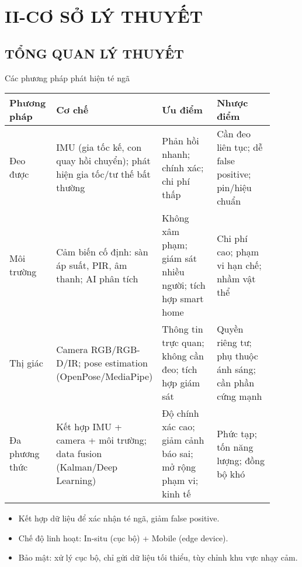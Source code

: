 \section{II-CƠ SỞ LÝ THUYẾT}
\subsection{TỔNG QUAN LÝ THUYẾT}
\begin{frame}{Các phương pháp phát hiện té ngã}
\scriptsize
\begin{tabular}{|p{0.18\linewidth}|p{0.22\linewidth}|p{0.25\linewidth}|p{0.25\linewidth}|}
\hline
\textbf{Phương pháp} & \textbf{Cơ chế} & \textbf{Ưu điểm} & \textbf{Nhược điểm} \\
\hline
Đeo được & IMU (gia tốc kế, con quay hồi chuyển); phát hiện gia tốc/tư thế bất thường & Phản hồi nhanh; chính xác; chi phí thấp & Cần đeo liên tục; dễ false positive; pin/hiệu chuẩn \\
\hline
Môi trường & Cảm biến cố định: sàn áp suất, PIR, âm thanh; AI phân tích & Không xâm phạm; giám sát nhiều người; tích hợp smart home & Chi phí cao; phạm vi hạn chế; nhầm vật thể \\
\hline
Thị giác & Camera RGB/RGB-D/IR; pose estimation (OpenPose/MediaPipe) & Thông tin trực quan; không cần đeo; tích hợp giám sát & Quyền riêng tư; phụ thuộc ánh sáng; cần phần cứng mạnh \\
\hline
Đa phương thức & Kết hợp IMU + camera + môi trường; data fusion (Kalman/Deep Learning) & Độ chính xác cao; giảm cảnh báo sai; mở rộng phạm vi; kinh tế & Phức tạp; tốn năng lượng; đồng bộ khó \\
\hline
\end{tabular}

\vspace{0.3em}
\begin{itemize}\scriptsize
    \item Kết hợp dữ liệu để xác nhận té ngã, giảm false positive.  
    \item Chế độ linh hoạt: In-situ (cục bộ) + Mobile (edge device).  
    \item Bảo mật: xử lý cục bộ, chỉ gửi dữ liệu tối thiểu, tùy chỉnh khu vực nhạy cảm.
\end{itemize}
\end{frame}

